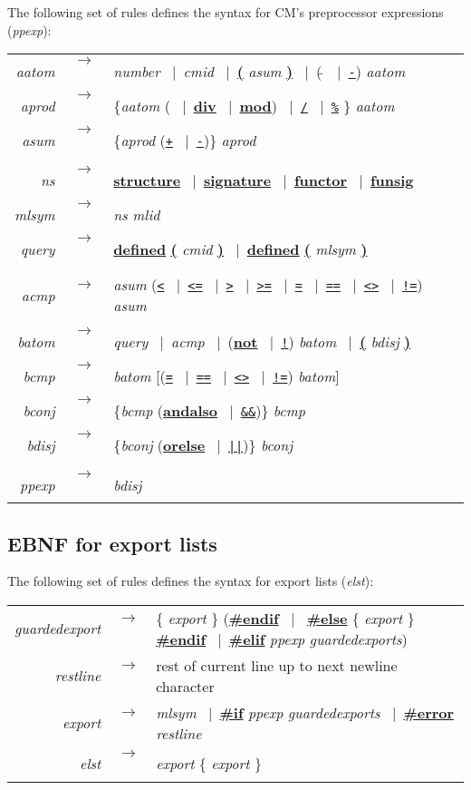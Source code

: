 \documentclass[titlepage,letterpaper]{article}
\newcommand{\nt}[1]{{\it #1}}
\newcommand{\tl}[1]{{\underline{\bf #1}}}
\newcommand{\ttl}[1]{{\underline{\tt #1}}}
\newcommand{\ar}{$\rightarrow$\ }
\newcommand{\vb}{~$|$~}
\begin{document}
\noindent The following set of rules defines the syntax for CM's
preprocessor expressions (\nt{ppexp}):

\begin{tabular}{rcl}
\nt{aatom}  &\ar& \nt{number} \vb \nt{cmid} \vb \tl{(} \nt{asum} \tl{)} \vb (\ttl{$\tilde{~}$} \vb \ttl{-}) \nt{aatom} \\
\nt{aprod}  &\ar& \{\nt{aatom} (\ttl{*} \vb \tl{div} \vb \tl{mod}) \vb \ttl{/} \vb \ttl{\%} \} \nt{aatom} \\
\nt{asum}   &\ar& \{\nt{aprod} (\ttl{+} \vb \ttl{-})\} \nt{aprod} \\
\\
\nt{ns}     &\ar& \tl{structure} \vb \tl{signature} \vb \tl{functor} \vb \tl{funsig} \\
\nt{mlsym}  &\ar& \nt{ns} \nt{mlid} \\
\nt{query}  &\ar& \tl{defined} \tl{(} \nt{cmid} \tl{)} \vb \tl{defined} \tl{(} \nt{mlsym} \tl{)} \\
\\
\nt{acmp}   &\ar& \nt{asum} (\ttl{<} \vb \ttl{<=} \vb \ttl{>} \vb \ttl{>=} \vb \ttl{=} \vb \ttl{==} \vb \ttl{<>} \vb \ttl{!=}) \nt{asum} \\
\\
\nt{batom}  &\ar& \nt{query} \vb \nt{acmp} \vb (\tl{not} \vb \ttl{!}) \nt{batom} \vb \tl{(} \nt{bdisj} \tl{)} \\
\nt{bcmp}   &\ar& \nt{batom} [(\ttl{=} \vb \ttl{==} \vb \ttl{<>} \vb \ttl{!=}) \nt{batom}] \\
\nt{bconj}  &\ar& \{\nt{bcmp} (\tl{andalso} \vb \ttl{\&\&})\} \nt{bcmp} \\
\nt{bdisj}  &\ar& \{\nt{bconj} (\tl{orelse} \vb \ttl{||})\} \nt{bconj} \\
\\
\nt{ppexp} &\ar& \nt{bdisj}
\end{tabular}

\subsection{EBNF for export lists}

The following set of rules defines the syntax for export lists (\nt{elst}):

\begin{tabular}{rcl}
\nt{guardedexport} &\ar& \{ \nt{export} \} (\tl{\#endif} \vb
\tl{\#else} \{ \nt{export} \} \tl{\#endif} \vb \tl{\#elif} \nt{ppexp}
\nt{guardedexports}) \\
\nt{restline}      &\ar& rest of current line up to next newline character \\
\nt{export}        &\ar& \nt{mlsym} \vb \tl{\#if} \nt{ppexp}
\nt{guardedexports} \vb \tl{\#error} \nt{restline}  \\
\nt{elst}       &\ar& \nt{export} \{ \nt{export} \} \\
\end{tabular}
\end{document}
